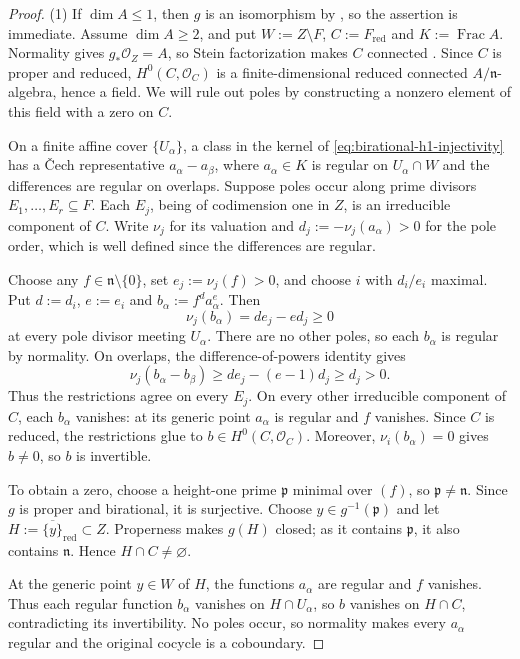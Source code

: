 \documentclass[a4paper,reqno]{amsart}
\def\O{\mathcal{O}}
\DeclareMathOperator{\Frac}{Frac}
\theoremstyle{definition}
\begin{document}
\begin{proof}
(1) If $\dim A\le1$, then $g$ is an isomorphism by \cite[Tag 0BFP]{stacks-project}, so the assertion is immediate. Assume $\dim A\ge2$, and put $W:=Z\setminus F$, $C:=F_{\mathrm{red}}$ and $K:=\Frac A$. Normality gives $g_*\O_Z=A$, so Stein factorization makes $C$ connected \cite[Tag 03H0]{stacks-project}. Since $C$ is proper and reduced, $H^0(C,\O_C)$ is a finite-dimensional reduced connected $A/\mathfrak n$-algebra, hence a field. We will rule out poles by constructing a nonzero element of this field with a zero on $C$.

On a finite affine cover $\{U_\alpha\}$, a class in the kernel of \eqref{eq:birational-h1-injectivity} has a \v{C}ech representative $a_\alpha-a_\beta$, where $a_\alpha\in K$ is regular on $U_\alpha\cap W$ and the differences are regular on overlaps. Suppose poles occur along prime divisors $E_1,\ldots,E_r\subseteq F$. Each $E_j$, being of codimension one in $Z$, is an irreducible component of $C$. Write $\nu_j$ for its valuation and $d_j:=-\nu_j(a_\alpha)>0$ for the pole order, which is well defined since the differences are regular.

Choose any $f\in\mathfrak n\setminus\{0\}$, set $e_j:=\nu_j(f)>0$, and choose $i$ with $d_i/e_i$ maximal. Put $d:=d_i$, $e:=e_i$ and $b_\alpha:=f^d a_\alpha^e$. Then
\[
\nu_j(b_\alpha)=de_j-ed_j\ge0
\]
at every pole divisor meeting $U_\alpha$. There are no other poles, so each $b_\alpha$ is regular by normality. On overlaps, the difference-of-powers identity gives
\[
\nu_j(b_\alpha-b_\beta)
\ge de_j-(e-1)d_j\ge d_j>0.
\]
Thus the restrictions agree on every $E_j$. On every other irreducible component of $C$, each $b_\alpha$ vanishes: at its generic point $a_\alpha$ is regular and $f$ vanishes. Since $C$ is reduced, the restrictions glue to $b\in H^0(C,\O_C)$. Moreover, $\nu_i(b_\alpha)=0$ gives $b\ne0$, so $b$ is invertible.

To obtain a zero, choose a height-one prime $\mathfrak p$ minimal over $(f)$, so $\mathfrak p\ne\mathfrak n$. Since $g$ is proper and birational, it is surjective. Choose $y\in g^{-1}(\mathfrak p)$ and let $H:=\overline{\{y\}}_{\mathrm{red}}\subset Z$. Properness makes $g(H)$ closed; as it contains $\mathfrak p$, it also contains $\mathfrak n$. Hence $H\cap C\ne\varnothing$.

At the generic point $y\in W$ of $H$, the functions $a_\alpha$ are regular and $f$ vanishes. Thus each regular function $b_\alpha$ vanishes on $H\cap U_\alpha$, so $b$ vanishes on $H\cap C$, contradicting its invertibility. No poles occur, so normality makes every $a_\alpha$ regular and the original cocycle is a coboundary.


\end{proof}
\end{document}
